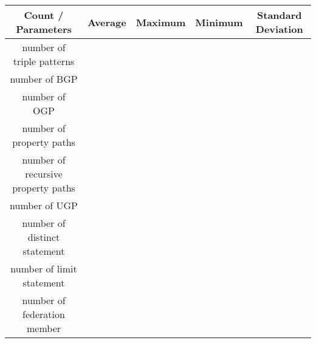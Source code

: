 \begin{center}
    \begin{tabular}{|*{5}{c|}}
     \hline
     Count / Parameters & Average & Maximum & Minimum & Standard Deviation \\ 
     \hline \hline
     number of triple patterns & {} & {} & {} & {} \\ 
     \hline
     number of BGP & {} & {} & {} & {} \\ 
     \hline
     number of OGP & {} & {} & {} & {} \\ 
     \hline
     number of property paths & {} & {} & {} & {} \\ 
     \hline
     number of recursive property paths & {} & {} & {} & {} \\ 
     \hline
     number of UGP & {} & {} & {} & {} \\ 
     \hline
     number of distinct statement & {} & {} & {} & {} \\ 
     \hline
     number of limit statement & {} & {} & {} & {} \\  
     \hline
     number of federation member & {} & {} & {} & {} \\  
     \hline
    \end{tabular}
\end{center}